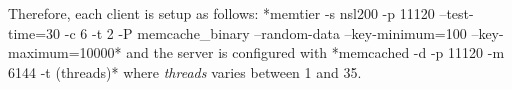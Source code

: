 Therefore, each client is setup as follows: *memtier -s nsl200 -p 11120 --test-time=30 -c 6 -t 2 -P memcache_binary --random-data --key-minimum=100 --key-maximum=10000* and the server is configured with *memcached -d -p 11120 -m 6144 -t (threads)* where \emph{threads} varies between 1 and 35.






